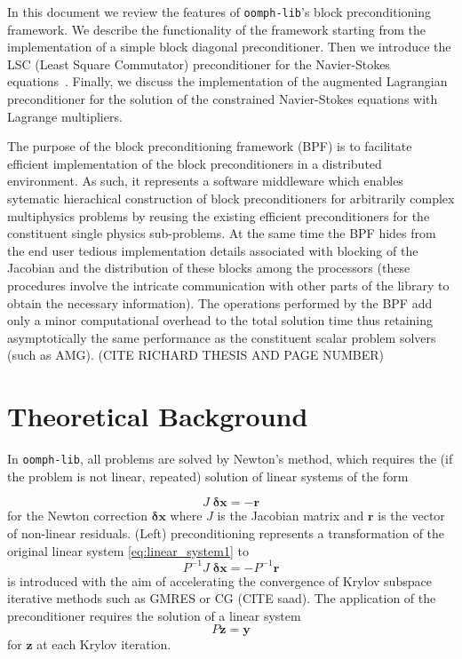 In this document we review the features of \texttt{oomph-lib}'s block 
preconditioning framework. We describe the functionality of the 
framework starting from the implementation of a simple block diagonal 
preconditioner. Then we introduce the LSC (Least Square Commutator) 
preconditioner for the Navier-Stokes equations~\cite{fastiterativesolvers}. 
Finally, we discuss the implementation of the augmented Lagrangian 
preconditioner for the solution of the constrained Navier-Stokes equations with
Lagrange multipliers.

The purpose of the block preconditioning framework (BPF) is to facilitate 
efficient implementation of the block preconditioners in a distributed 
environment. As such, it represents a software middleware which enables 
sytematic hierachical construction of block preconditioners for arbitrarily 
complex multiphysics problems by reusing the existing efficient preconditioners
for the constituent single physics sub-problems. At the same time the BPF hides
from the end user tedious implementation details associated with blocking of 
the Jacobian and the distribution of these blocks among the processors (these 
procedures involve the intricate communication with other parts of the library 
to obtain the necessary information). The operations performed by the BPF add 
only a minor computational overhead to the total solution time thus retaining 
asymptotically the same performance as the constituent scalar problem solvers 
(such as AMG). (CITE RICHARD THESIS AND PAGE NUMBER)

\section{ Theoretical Background\label{sec:theoretical_background}}
In \texttt{oomph-lib}, all problems are solved by Newton's method, which requires
the (if the problem is not linear, repeated) solution of linear systems of the 
form

\begin{equation}
J\;\mathbf{\delta x} = -\mathbf{r}
\label{eq:linear_system1}
\end{equation}
for the Newton correction $\mathbf{\delta x}$ where $J$ is the
Jacobian matrix and $\mathbf{r}$ is the vector of non-linear residuals. (Left) 
preconditioning represents a transformation of the original linear system 
\eqref{eq:linear_system1} to
\begin{equation*}
P^{-1}J\;\mathbf{ \delta x}=-P^{-1}\mathbf{r}
\end{equation*}
is introduced with the aim of accelerating the convergence of Krylov subspace 
iterative methods such as GMRES or CG (CITE saad). The application of the 
preconditioner requires the solution of a linear system
\begin{equation*}
P\mathbf{z}=\mathbf{y}
\end{equation*}
for $\mathbf{z}$ at each Krylov iteration.

